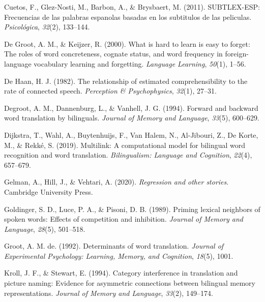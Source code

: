\documentclass[
  english,
  man,floatsintext]{apa6}
\newlength{\cslhangindent}
\newenvironment{CSLReferences}[2] %
 {%
  \setlength{\parindent}{0pt}
  \ifodd #1 \everypar{\setlength{\hangindent}{\cslhangindent}}\ignorespaces\fi
  \ifnum #2 > 0
  \setlength{\parskip}{#2\baselineskip}
  \fi
 }%
 {}
\begin{document}
\begin{CSLReferences}{1}{0}
\leavevmode{}%
Cuetos, F., Glez-Nosti, M., Barbon, A., \& Brysbaert, M. (2011). SUBTLEX-ESP: Frecuencias de las palabras espanolas basadas en los subtitulos de las peliculas. \emph{Psicol{ó}gica}, \emph{32}(2), 133--144.

\leavevmode{}%
De Groot, A. M., \& Keijzer, R. (2000). What is hard to learn is easy to forget: The roles of word concreteness, cognate status, and word frequency in foreign-language vocabulary learning and forgetting. \emph{Language Learning}, \emph{50}(1), 1--56.

\leavevmode{}%
De Haan, H. J. (1982). The relationship of estimated comprehensibility to the rate of connected speech. \emph{Perception \& Psychophysics}, \emph{32}(1), 27--31.

\leavevmode{}%
Degroot, A. M., Dannenburg, L., \& Vanhell, J. G. (1994). Forward and backward word translation by bilinguals. \emph{Journal of Memory and Language}, \emph{33}(5), 600--629.

\leavevmode{}%
Dijkstra, T., Wahl, A., Buytenhuijs, F., Van Halem, N., Al-Jibouri, Z., De Korte, M., \& Rekké, S. (2019). Multilink: A computational model for bilingual word recognition and word translation. \emph{Bilingualism: Language and Cognition}, \emph{22}(4), 657--679.

\leavevmode{}%
Gelman, A., Hill, J., \& Vehtari, A. (2020). \emph{Regression and other stories}. Cambridge University Press.

\leavevmode{}%
Goldinger, S. D., Luce, P. A., \& Pisoni, D. B. (1989). Priming lexical neighbors of spoken words: Effects of competition and inhibition. \emph{Journal of Memory and Language}, \emph{28}(5), 501--518.

\leavevmode{}%
Groot, A. M. de. (1992). Determinants of word translation. \emph{Journal of Experimental Psychology: Learning, Memory, and Cognition}, \emph{18}(5), 1001.

\leavevmode{}%
Kroll, J. F., \& Stewart, E. (1994). Category interference in translation and picture naming: Evidence for asymmetric connections between bilingual memory representations. \emph{Journal of Memory and Language}, \emph{33}(2), 149--174.


\end{CSLReferences}
\end{document}
